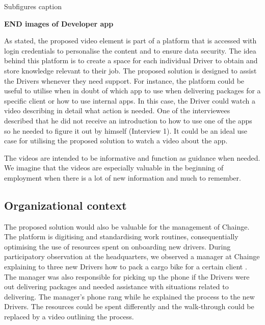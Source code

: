 \begin{pandoccrossrefsubfigures}
\caption[{Subfigures caption}]{Subfigures caption}

\label{fig:developer}

\end{pandoccrossrefsubfigures}

\textbf{END images of Developer app}

As stated, the proposed video element is part of a platform that is
accessed with login credentials to personalise the content and to ensure
data security. The idea behind this platform is to create a space for
each individual Driver to obtain and store knowledge relevant to their
job. The proposed solution is designed to assist the Drivers whenever
they need support. For instance, the platform could be useful to utilise
when in doubt of which app to use when delivering packages for a
specific client or how to use internal apps. In this case, the Driver
could watch a video describing in detail what action is needed. One of
the interviewees described that he did not receive an introduction to
how to use one of the apps so he needed to figure it out by himself
(Interview 1). It could be an ideal use case for utilising the proposed
solution to watch a video about the app.

The videos are intended to be informative and function as guidance when
needed. We imagine that the videos are especially valuable in the
beginning of employment when there is a lot of new information and much
to remember.

\hypertarget{sec:organisational_context}{%
\subsection{Organizational context}\label{sec:organisational_context}}

The proposed solution would also be valuable for the management of
Chainge. The platform is digitising and standardising work routines,
consequentially optimising the use of resources spent on onboarding new
drivers. During participatory observation at the headquarters, we
observed a manager at Chainge explaining to three new Drivers how to
pack a cargo bike for a certain client . The manager was also
responsible for picking up the phone if the Drivers were out delivering
packages and needed assistance with situations related to delivering.
The manager's phone rang while he explained the process to the new
Drivers. The resources could be spent differently and the walk-through
could be replaced by a video outlining the process.

